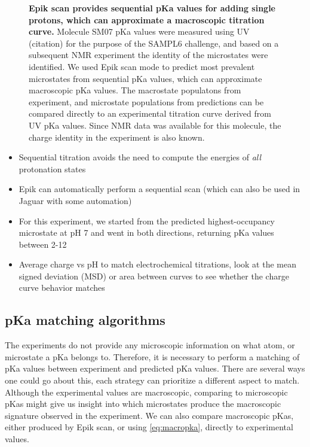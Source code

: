 \documentclass[9pt,lineno,final]{elife}
\begin{document}
\begin{figure}[H]
		\caption{{\bf Epik scan provides sequential pKa values for adding single protons, which can approximate a macroscopic titration curve.} Molecule SM07 pKa values were measured using UV (citation) for the purpose of the SAMPL6 challenge, and based on a subsequent NMR experiment the identity of the microstates were identified. We used Epik scan mode to predict most prevalent microstates from sequential pKa values, which can approximate macroscopic pKa values. The macrostate populatons from experiment, and microstate populations from predictions can be compared directly to an experimental titration curve derived from UV pKa values. Since NMR data was available for this molecule, the charge identity in the experiment is also known. 
	\label{fig:scan-prediction}}
	
\end{figure}


\begin{itemize}
	\item Sequential titration avoids the need to compute the energies of \emph{all} protonation states
	\item Epik can automatically perform a sequential scan (which can also be used in Jaguar with some automation)
	\item For this experiment, we started from the predicted highest-occupancy microstate at pH 7 and went in both directions, returning pKa values between 2-12
	\item Average charge vs pH to match electrochemical titrations, look at the mean signed deviation (MSD) or area between curves to see whether the charge curve behavior matches
\end{itemize}

\subsection{pKa matching algorithms}
The experiments do not provide any microscopic information on what atom, or microstate a pKa belongs to.
%
Therefore, it is necessary to perform a matching of pKa values between experiment and predicted pKa values.
%
There are several ways one could go about this, each strategy can prioritize a different aspect to match.
%
Although the experimental values are macroscopic, comparing to microscopic pKas might give us insight into which microstates produce the macroscopic signature observed in the experiment.
%
We can also compare macroscopic pKas, either produced by Epik scan, or using \cref{eq:macropka}, directly to experimental values.
%
\end{document}
